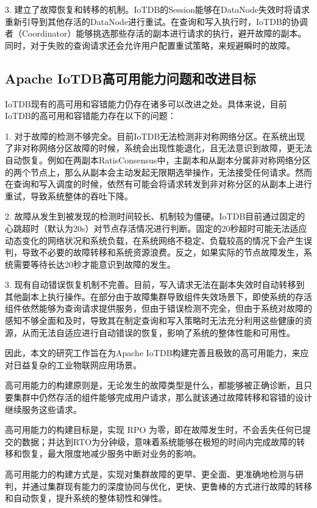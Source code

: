 3. 建立了故障恢复和转移的机制。IoTDB的Session能够在DataNode失效时将请求重新引导到其他存活的DataNode进行重试。在查询和写入执行时，IoTDB的协调者（Coordinator）能够挑选那些存活的副本进行请求的执行，避开故障的副本。同时，对于失败的查询请求还会允许用户配置重试策略，来规避瞬时的故障。

\subsection{Apache IoTDB高可用能力问题和改进目标}

IoTDB现有的高可用和容错能力仍存在诸多可以改进之处。具体来说，目前IoTDB的高可用和容错能力存在以下的问题：

1. 对于故障的检测不够完全。目前IoTDB无法检测非对称网络分区。在系统出现了非对称网络分区故障的时候，系统会出现性能退化，且无法意识到故障，更无法自动恢复。例如在两副本RatisConsensus中，主副本和从副本分属非对称网络分区的两个节点上，那么从副本会主动发起无限期选举操作，无法接受任何请求。然而在查询和写入调度的时候，依然有可能会将请求转发到非对称分区的从副本上进行重试，导致系统整体的吞吐下降。


2. 故障从发生到被发现的检测时间较长、机制较为僵硬。IoTDB目前通过固定的心跳超时（默认为20s）对节点存活情况进行判断。固定的20秒超时可能无法适应动态变化的网络状况和系统负载，在系统网络不稳定、负载较高的情况下会产生误判，导致不必要的故障转移和系统资源浪费。反之，如果实际的节点故障发生，系统需要等待长达20秒才能意识到故障的发生。

3. 现有自动错误恢复机制不完善。目前，写入请求无法在副本失效时自动转移到其他副本上执行操作。在部分由于故障集群导致组件失效场景下，即使系统的存活组件依然能够为查询请求提供服务，但由于错误检测不完全，但由于系统对故障的感知不够全面和及时，导致其在制定查询和写入策略时无法充分利用这些健康的资源，从而无法自适应进行自动错误的恢复，影响了系统的整体性能和可用性。


因此，本文的研究工作旨在为Apache IoTDB构建完善且极致的高可用能力，来应对日益复杂的工业物联网应用场景。

高可用能力的构建原则是，无论发生的故障类型是什么，都能够被正确诊断，且只要集群中仍然存活的组件能够完成用户请求，那么就该通过故障转移和容错的设计继续服务这些请求。

高可用能力的构建目标是，实现 RPO 为零，即在故障发生时，不会丢失任何已提交的数据；并达到RTO为分钟级，意味着系统能够在极短的时间内完成故障的转移和恢复，最大限度地减少服务中断对业务的影响。

高可用能力的构建方式是，实现对集群故障的更早、更全面、更准确地检测与研判，并通过集群现有能力的深度协同与优化，更快、更鲁棒的方式进行故障的转移和自动恢复，提升系统的整体韧性和弹性。


